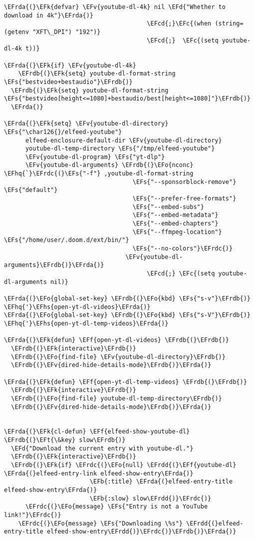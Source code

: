 \documentclass[a4wide,10pt]{article}
\newcommand{\EFc}[1]{\textcolor{EFc}{#1}} %
\newcommand{\EFcd}[1]{\textcolor{EFcd}{#1}} %
\newcommand{\EFs}[1]{\textcolor{EFs}{#1}} %
\newcommand{\EFd}[1]{\textcolor{EFd}{#1}} %
\newcommand{\EFk}[1]{\textcolor{EFk}{#1}} %
\newcommand{\EFb}[1]{\textcolor{EFb}{#1}} %
\newcommand{\EFf}[1]{\textcolor{EFf}{#1}} %
\newcommand{\EFv}[1]{\textcolor{EFv}{#1}} %
\newcommand{\EFt}[1]{\textcolor{EFt}{#1}} %
\newcommand{\EFo}[1]{\textcolor{EFo}{#1}} %
\newcommand{\EFhq}[1]{\textcolor{EFhq}{#1}} %
\newcommand{\EFhs}[1]{\textcolor{EFhs}{#1}} %
\newcommand{\EFrda}[1]{\textcolor{EFrda}{#1}} %
\newcommand{\EFrdb}[1]{\textcolor{EFrdb}{#1}} %
\newcommand{\EFrdc}[1]{\textcolor{EFrdc}{#1}} %
\newcommand{\EFrdd}[1]{\textcolor{EFrdd}{#1}} %
\begin{document}
\begin{Code}
\begin{Verbatim}
\EFrda{(}\EFk{defvar} \EFv{youtube-dl-4k} nil \EFd{"Whether to download in 4k"}\EFrda{)}
                                        \EFcd{;}\EFc{(when (string= (getenv "XFT\_DPI") "192")}
                                        \EFcd{;}  \EFc{(setq youtube-dl-4k t))}

\EFrda{(}\EFk{if} \EFv{youtube-dl-4k}
    \EFrdb{(}\EFk{setq} youtube-dl-format-string \EFs{"bestvideo+bestaudio"}\EFrdb{)}
  \EFrdb{(}\EFk{setq} youtube-dl-format-string \EFs{"bestvideo[height<=1080]+bestaudio/best[height<=1080]"}\EFrdb{)}
  \EFrda{)}

\EFrda{(}\EFk{setq} \EFv{youtube-dl-directory} \EFs{"\char126{}/elfeed-youtube"}
      elfeed-enclosure-default-dir \EFv{youtube-dl-directory}
      youtube-dl-temp-directory \EFs{"/tmp/elfeed-youtube"}
      \EFv{youtube-dl-program} \EFs{"yt-dlp"}
      \EFv{youtube-dl-arguments} \EFrdb{(}\EFo{nconc} \EFhq{`}\EFrdc{(}\EFs{"-f"} ,youtube-dl-format-string
                                    \EFs{"--sponsorblock-remove"} \EFs{"default"}
                                    \EFs{"--prefer-free-formats"}
                                    \EFs{"--embed-subs"}
                                    \EFs{"--embed-metadata"}
                                    \EFs{"--embed-chapters"}
                                    \EFs{"--ffmpeg-location"} \EFs{"/home/user/.doom.d/ext/bin/"}
                                    \EFs{"--no-colors"}\EFrdc{)}
                                  \EFv{youtube-dl-arguments}\EFrdb{)}\EFrda{)}
                                        \EFcd{;} \EFc{(setq youtube-dl-arguments nil)}

\EFrda{(}\EFo{global-set-key} \EFrdb{(}\EFo{kbd} \EFs{"s-v"}\EFrdb{)} \EFhq{'}\EFhs{open-yt-dl-videos}\EFrda{)}
\EFrda{(}\EFo{global-set-key} \EFrdb{(}\EFo{kbd} \EFs{"s-V"}\EFrdb{)} \EFhq{'}\EFhs{open-yt-dl-temp-videos}\EFrda{)}

\EFrda{(}\EFk{defun} \EFf{open-yt-dl-videos} \EFrdb{(}\EFrdb{)}
  \EFrdb{(}\EFk{interactive}\EFrdb{)}
  \EFrdb{(}\EFo{find-file} \EFv{youtube-dl-directory}\EFrdb{)}
  \EFrdb{(}\EFv{dired-hide-details-mode}\EFrdb{)}\EFrda{)}

\EFrda{(}\EFk{defun} \EFf{open-yt-dl-temp-videos} \EFrdb{(}\EFrdb{)}
  \EFrdb{(}\EFk{interactive}\EFrdb{)}
  \EFrdb{(}\EFo{find-file} youtube-dl-temp-directory\EFrdb{)}
  \EFrdb{(}\EFv{dired-hide-details-mode}\EFrdb{)}\EFrda{)}


\EFrda{(}\EFk{cl-defun} \EFf{elfeed-show-youtube-dl} \EFrdb{(}\EFt{\&key} slow\EFrdb{)}
  \EFd{"Download the current entry with youtube-dl."}
  \EFrdb{(}\EFk{interactive}\EFrdb{)}
  \EFrdb{(}\EFk{if} \EFrdc{(}\EFo{null} \EFrdd{(}\EFf{youtube-dl} \EFrda{(}elfeed-entry-link elfeed-show-entry\EFrda{)}
                        \EFb{:title} \EFrda{(}elfeed-entry-title elfeed-show-entry\EFrda{)}
                        \EFb{:slow} slow\EFrdd{)}\EFrdc{)}
      \EFrdc{(}\EFo{message} \EFs{"Entry is not a YouTube link!"}\EFrdc{)}
    \EFrdc{(}\EFo{message} \EFs{"Downloading \%s"} \EFrdd{(}elfeed-entry-title elfeed-show-entry\EFrdd{)}\EFrdc{)}\EFrdb{)}\EFrda{)}



\end{Verbatim}
\end{Code}
\end{document}
